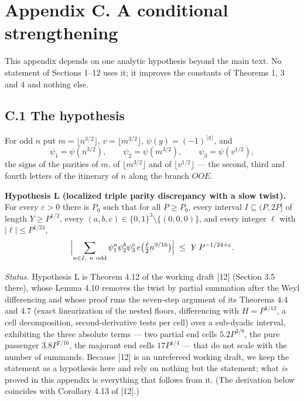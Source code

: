 \documentclass[11pt,a4paper]{article}
\begin{document}
\section{Appendix C. A conditional
strengthening}\label{appendix-c.-a-conditional-strengthening}

This appendix depends on one analytic hypothesis beyond the main text.
No statement of Sections 1--12 uses it; it improves the constants of
Theorems 1, 3 and 4 and nothing else.

\subsection{C.1 The hypothesis}\label{c.1-the-hypothesis}

For odd \(n\) put \(m=\lfloor n^{3/2}\rfloor\),
\(v=\lfloor m^{3/2}\rfloor\), \(\psi(y)=(-1)^{\lfloor y\rfloor}\), and
\[
\psi_1=\psi(n^{3/2}),\qquad\psi_2=\psi(m^{3/2}),\qquad\psi_3=\psi(v^{1/2}),
\] the signs of the parities of \(m\), of \(\lfloor m^{3/2}\rfloor\) and
of \(\lfloor v^{1/2}\rfloor\) --- the second, third and fourth letters
of the itinerary of \(n\) along the branch \(OOE\).

\textbf{Hypothesis L (localized triple parity discrepancy with a slow
twist).} For every \(\varepsilon>0\) there is \(P_0\) such that for all
\(P\ge P_0\), every interval \(I\subseteq(P,2P]\) of length
\(Y\ge P^{1/2}\), every \((a,b,c)\in\{0,1\}^3\setminus\{(0,0,0)\}\), and
every integer \(\ell\) with \(|\ell|\le P^{1/24}\), \[
\Bigl|\sum_{n\in I,\ n\ \mathrm{odd}}\psi_1^{a}\psi_2^{b}\psi_3^{c}\,e\bigl(\tfrac{\ell}{2}n^{9/16}\bigr)\Bigr|
\ \le\ Y\,P^{-1/24+\varepsilon}.
\]

\emph{Status.} Hypothesis L is Theorem 4.12 of the working draft
{[}12{]} (Section 3.5 there), whose Lemma 4.10 removes the twist by
partial summation after the Weyl differencing and whose proof runs the
seven-step argument of its Theorems 4.4 and 4.7 (exact linearization of
the nested floors, differencing with \(H=P^{1/12}\), a cell
decomposition, second-derivative tests per cell) over a sub-dyadic
interval, exhibiting the three absolute terms --- two partial end cells
\(5.2P^{3/8}\), the pure passenger \(3.8P^{7/16}\), the majorant end
cells \(17P^{1/4}\) --- that do not scale with the number of summands.
Because {[}12{]} is an unrefereed working draft, we keep the statement
as a hypothesis here and rely on nothing but the statement; what
\emph{is} proved in this appendix is everything that follows from it.
(The derivation below coincides with Corollary 4.13 of {[}12{]}.)
\end{document}
